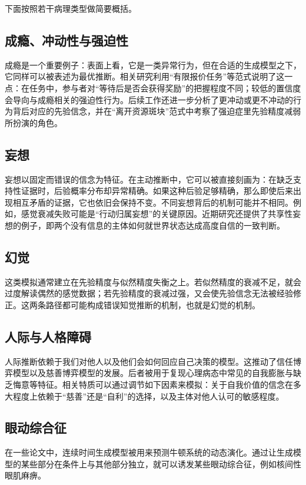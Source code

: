 下面按照若干病理类型做简要概括。

\subsection*{成瘾、冲动性与强迫性}

成瘾是一个重要例子：表面上看，它是一类异常行为，但在合适的生成模型之下，它同样可以被表述为最优推断。相关研究利用“有限报价任务”等范式说明了这一点：在任务中，参与者对“等待后是否会获得奖励”的把握程度不同；较低的置信度会导向与成瘾相关的强迫性行为。后续工作还进一步分析了更冲动或更不冲动的行为背后对应的先验信念，并在“离开资源斑块”范式中考察了强迫症里先验精度减弱所扮演的角色。

\subsection*{妄想}

妄想以固定而错误的信念为特征。在主动推断中，它可以被直接刻画为：在缺乏支持性证据时，后验概率分布却异常精确。如果这种后验足够精确，那么即使后来出现相互矛盾的证据，它也依旧会保持不变。不同妄想背后的机制可能并不相同。例如，感觉衰减失败可能是“行动归属妄想”的关键原因。近期研究还提供了共享性妄想的例子，即两个没有信息的主体如何就世界状态达成高度自信的一致判断。

\subsection*{幻觉}

这类模拟通常建立在先验精度与似然精度失衡之上。若似然精度的衰减不足，就会过度解读偶然的感觉数据；若先验精度的衰减过强，又会使先验信念无法被经验修正。这两条路径都可能构成错误知觉推断的机制，也就是幻觉的机制。

\subsection*{人际与人格障碍}

人际推断依赖于我们对他人以及他们会如何回应自己决策的模型。这推动了信任博弈模型以及慈善博弈模型的发展。后者被用于复现心理病态中常见的自我膨胀与缺乏悔意等特征。相关特质可以通过调节如下因素来模拟：关于自我价值的信念在多大程度上依赖于“慈善”还是“自利”的选择，以及主体对他人认可的敏感程度。

\subsection*{眼动综合征}

在一些论文中，连续时间生成模型被用来预测牛顿系统的动态演化。通过让生成模型的某些部分在条件上与其他部分独立，就可以诱发某些眼动综合征，例如核间性眼肌麻痹。

